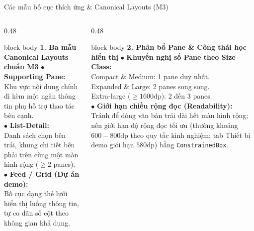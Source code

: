 \documentclass[aspectratio=169, 10pt]{beamer}
\begin{document}
\begin{frame}{Các mẫu bố cục thích ứng \& Canonical Layouts (M3)}
  \vspace{-0.1cm}
  \begin{columns}[T]
    \begin{column}{0.48\textwidth}
      \begin{beamercolorbox}[rounded=true, shadow=false, wd=\textwidth, sep=5.5pt]{block body}
        \textbf{\normalsize\color{blue!80!black}1. Ba mẫu Canonical Layouts chuẩn M3}
        \vskip 0.1cm
        \small
        $\bullet$ \textbf{Supporting Pane:}\\
        Khu vực nội dung chính đi kèm một ngăn thông tin phụ hỗ trợ thao tác bên cạnh.\\[0.12cm]
        $\bullet$ \textbf{List-Detail:}\\
        Danh sách chọn bên trái, khung chi tiết bên phải trên cùng một màn hình rộng ($\ge 2$ panes).\\[0.12cm]
        $\bullet$ \textbf{Feed / Grid (Dự án demo):}\\
        Bố cục dạng thẻ lưới hiển thị luồng thông tin, tự co dãn số cột theo không gian khả dụng.
      \end{beamercolorbox}
    \end{column}

    \begin{column}{0.48\textwidth}
      \begin{beamercolorbox}[rounded=true, shadow=false, wd=\textwidth, sep=5.5pt]{block body}
        \textbf{\normalsize\color{blue!80!black}2. Phân bổ Pane \& Công thái học hiển thị}
        \vskip 0.1cm
        \small
        $\bullet$ \textbf{Khuyến nghị số Pane theo Size Class:}\\
        Compact \& Medium: 1 pane duy nhất.\\
        Expanded \& Large: 2 panes song song.\\
        Extra-large ($\ge 1600\text{dp}$): 2 đến 3 panes.\\[0.12cm]
        $\bullet$ \textbf{Giới hạn chiều rộng đọc (Readability):}\\
        Tránh để dòng văn bản trải dài hết màn hình rộng; nên giới hạn độ rộng đọc tối ưu (thường khoảng $600 - 800\text{dp}$ theo quy tắc kinh nghiệm; tab Thiết bị demo giới hạn $580\text{dp}$) bằng \texttt{ConstrainedBox}.
      \end{beamercolorbox}
    \end{column}
  \end{columns}
  \vspace{0.2cm}
\end{frame}
\end{document}
